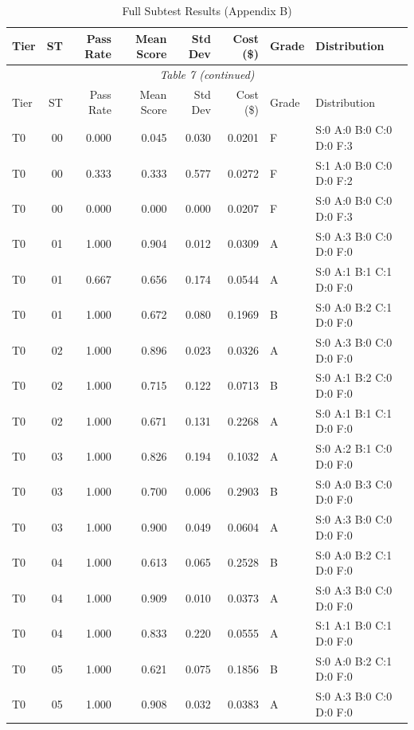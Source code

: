\begin{longtable}{lrrrrrll}
\caption{Full Subtest Results (Appendix B)} \label{tab:subtest_detail} \\
\toprule
Tier & ST & Pass Rate & Mean Score & Std Dev & Cost (\$) & Grade & Distribution \\
\midrule
\endfirsthead
\multicolumn{8}{c}{\textit{Table 7 (continued)}} \\
\toprule
Tier & ST & Pass Rate & Mean Score & Std Dev & Cost (\$) & Grade & Distribution \\
\midrule
\endhead
\bottomrule
\endfoot
T0 & 00 & 0.000 & 0.045 & 0.030 & 0.0201 & F & \tiny S:0 A:0 B:0 C:0 D:0 F:3 \\
T0 & 00 & 0.333 & 0.333 & 0.577 & 0.0272 & F & \tiny S:1 A:0 B:0 C:0 D:0 F:2 \\
T0 & 00 & 0.000 & 0.000 & 0.000 & 0.0207 & F & \tiny S:0 A:0 B:0 C:0 D:0 F:3 \\
T0 & 01 & 1.000 & 0.904 & 0.012 & 0.0309 & A & \tiny S:0 A:3 B:0 C:0 D:0 F:0 \\
T0 & 01 & 0.667 & 0.656 & 0.174 & 0.0544 & A & \tiny S:0 A:1 B:1 C:1 D:0 F:0 \\
T0 & 01 & 1.000 & 0.672 & 0.080 & 0.1969 & B & \tiny S:0 A:0 B:2 C:1 D:0 F:0 \\
T0 & 02 & 1.000 & 0.896 & 0.023 & 0.0326 & A & \tiny S:0 A:3 B:0 C:0 D:0 F:0 \\
T0 & 02 & 1.000 & 0.715 & 0.122 & 0.0713 & B & \tiny S:0 A:1 B:2 C:0 D:0 F:0 \\
T0 & 02 & 1.000 & 0.671 & 0.131 & 0.2268 & A & \tiny S:0 A:1 B:1 C:1 D:0 F:0 \\
T0 & 03 & 1.000 & 0.826 & 0.194 & 0.1032 & A & \tiny S:0 A:2 B:1 C:0 D:0 F:0 \\
T0 & 03 & 1.000 & 0.700 & 0.006 & 0.2903 & B & \tiny S:0 A:0 B:3 C:0 D:0 F:0 \\
T0 & 03 & 1.000 & 0.900 & 0.049 & 0.0604 & A & \tiny S:0 A:3 B:0 C:0 D:0 F:0 \\
T0 & 04 & 1.000 & 0.613 & 0.065 & 0.2528 & B & \tiny S:0 A:0 B:2 C:1 D:0 F:0 \\
T0 & 04 & 1.000 & 0.909 & 0.010 & 0.0373 & A & \tiny S:0 A:3 B:0 C:0 D:0 F:0 \\
T0 & 04 & 1.000 & 0.833 & 0.220 & 0.0555 & A & \tiny S:1 A:1 B:0 C:1 D:0 F:0 \\
T0 & 05 & 1.000 & 0.621 & 0.075 & 0.1856 & B & \tiny S:0 A:0 B:2 C:1 D:0 F:0 \\
T0 & 05 & 1.000 & 0.908 & 0.032 & 0.0383 & A & \tiny S:0 A:3 B:0 C:0 D:0 F:0 \\

\end{longtable}
